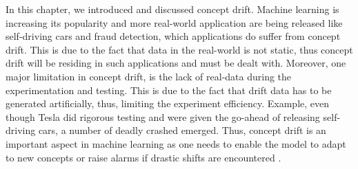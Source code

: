 In this chapter, we introduced and discussed concept drift. Machine learning is increasing its popularity and more real-world application are being released like self-driving cars and fraud detection, which applications do suffer from concept drift. This is due to the fact that data in the real-world is not static, thus concept drift will be residing in such applications and must be dealt with.  
Moreover, one major limitation in concept drift, is the lack of real-data during the experimentation and testing. This is due to the fact that drift data has to be generated artificially, thus, limiting the experiment efficiency. Example, even though Tesla did rigorous testing and were given the go-ahead of releasing self-driving cars, a number of deadly crashed emerged. Thus, concept drift is an important aspect in machine learning as one needs to enable the model to adapt to new concepts or raise alarms if drastic shifts are encountered \citep{Stewart2018}. 